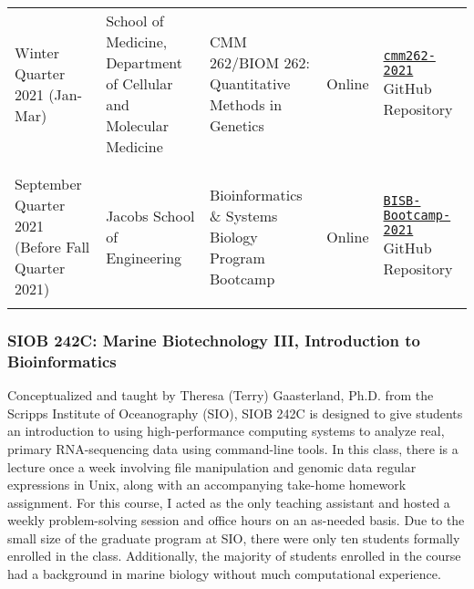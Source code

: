 \begin{small}
\begin{landscape}
\begin{table}[]
\begin{tabular}{p{} p{} p{} p{} p{}}
            Winter Quarter 2021 (Jan-Mar) & School of Medicine, Department of Cellular and Molecular Medicine & CMM 262/BIOM 262: Quantitative Methods in Genetics & Online & \href{https://github.com/biom262/cmm262-2021}{\texttt{cmm262-2021}} GitHub Repository \\ \\ \hline \\ 
            
            September Quarter 2021 (Before Fall Quarter 2021) & Jacobs School of Engineering & Bioinformatics \& Systems Biology Program Bootcamp & Online & \href{https://github.com/mragsac/BISB-Bootcamp-2021}{\texttt{BISB-Bootcamp-2021}} GitHub Repository \\ \\ \hline
            
            \end{tabular}
        \end{table}
    \end{landscape}
\end{small}

\subsubsection{SIOB 242C: Marine Biotechnology III, Introduction to Bioinformatics}

Conceptualized and taught by Theresa (Terry) Gaasterland, Ph.D. from the Scripps Institute of Oceanography (SIO), SIOB 242C is designed to give students an introduction to using high-performance computing systems to analyze real, primary RNA-sequencing data using command-line tools. In this class, there is a lecture once a week involving file manipulation and genomic data regular expressions in Unix, along with an accompanying take-home homework assignment. For this course, I acted as the only teaching assistant and hosted a weekly problem-solving session and office hours on an as-needed basis. Due to the small size of the graduate program at SIO, there were only ten students formally enrolled in the class. Additionally, the majority of students enrolled in the course had a background in marine biology without much computational experience.

